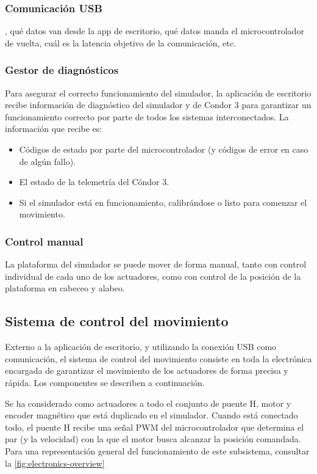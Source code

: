 \documentclass[sans]{cdvreport}
\begin{document}
\subsubsection{Comunicación USB}
, qué datos van desde la app de escritorio, qué datos manda el microcontrolador de vuelta, cuál es la latencia objetivo de la comunicación, etc.

\subsubsection{Gestor de diagnósticos}
Para asegurar el correcto funcionamiento del simulador, la aplicación de escritorio recibe información de diagnóstico del simulador y de Condor 3 para garantizar un funcionamiento correcto por parte de todos los sistemas interconectados. La información que recibe es:
\begin{itemize}
	\item Códigos de estado por parte del microcontrolador (y códigos de error en caso de algún fallo).
	\item El estado de la telemetría del Cóndor 3.
	\item Si el simulador está en funcionamiento, calibrándose o listo para comenzar el movimiento.
\end{itemize}

\subsubsection{Control manual}
La plataforma del simulador se puede mover de forma manual, tanto con control individual de cada uno de los actuadores, como con control de la posición de la plataforma en cabeceo y alabeo.

\subsection{Sistema de control del movimiento}
Externo a la aplicación de escritorio, y utilizando la conexión USB como comunicación, el sistema de control del movimiento consiste en toda la electrónica encargada de garantizar el movimiento de los actuadores de forma precisa y rápida. Los componentes se describen a continuación.
\par Se ha considerado como actuadores a todo el conjunto de puente H, motor y encoder magnético que está duplicado en el simulador. Cuando está conectado todo, el puente H recibe una señal PWM del microcontrolador que determina el par (y la velocidad) con la que el motor busca alcanzar la posición comandada. Para una representación general del funcionamiento de este subsistema, consultar la \autoref{fig:electronics-overview}
\end{document}
